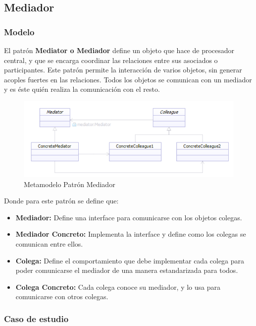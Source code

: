 \subsection{Mediador}

\subsubsection{Modelo}
El patrón \textbf{Mediator o Mediador} define un objeto que hace de procesador central, y que se encarga coordinar las relaciones entre sus asociados o participantes. Este patrón permite la interacción de varios objetos, sin generar acoples fuertes en las relaciones. Todos los objetos se comunican con un mediador y es éste quién realiza la comunicación con el resto.

\begin{figure}[th!]
	\centering
	\includegraphics[width=0.8\linewidth]{arquitectura/imagenes/modeloMediador}
	\caption{Metamodelo Patrón Mediador}
	\label{fig:metamodelo patron mediador}
\end{figure}

Donde para este patrón se define que:
\begin{itemize}
	\item \textbf{Mediador: }Define una interface para comunicarse con los objetos colegas.
	\item \textbf{Mediador Concreto: }Implementa la interface y define como los colegas se comunican entre ellos.
	\item \textbf{Colega: }Define el comportamiento que debe implementar cada colega para poder comunicarse el mediador de una manera estandarizada para todos.
	\item \textbf{Colega Concreto: }Cada colega conoce su mediador, y lo usa para comunicarse con otros colegas.
\end{itemize}

\subsubsection{Caso de estudio}

